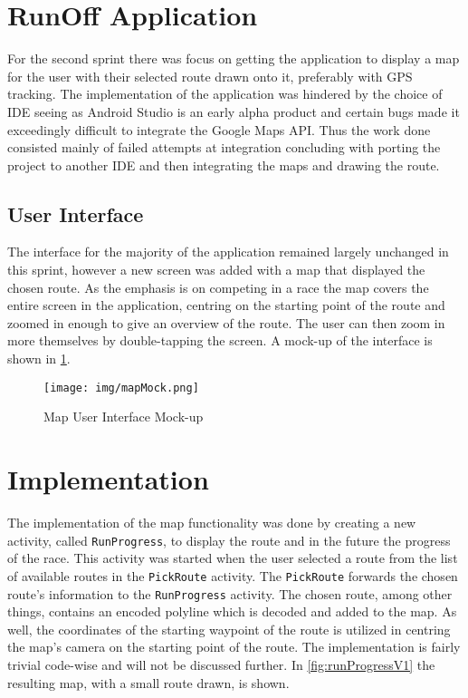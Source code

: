 \section{RunOff Application}
For the second sprint there was focus on getting the application to display a map for the user with their selected route drawn onto it, preferably with \ac{GPS} tracking. The implementation of the application was hindered by the choice of \ac{IDE} seeing as Android Studio is an early alpha product and certain bugs made it exceedingly difficult to integrate the Google Maps \ac{API}. Thus the work done consisted mainly of failed attempts at integration concluding with porting the project to another \ac{IDE} and then integrating the maps and drawing the route.

\subsection{User Interface}
The interface for the majority of the application remained largely unchanged in this sprint, however a new screen was added with a map that displayed the chosen route. As the emphasis is on competing in a race the map covers the entire screen in the application, centring on the starting point of the route and zoomed in enough to give an overview of the route. The user can then zoom in more themselves by double-tapping the screen. A mock-up of the interface is shown in \ref{fig:mapMock}.

\begin{figure}[ht]
\begin{center}
 \caption{Map User Interface Mock-up}
 \label{fig:mapMock}
 \texttt{[image: img/mapMock.png]}
\end{center}
\end{figure}

\section{Implementation}
The implementation of the map functionality was done by creating a new activity, called \texttt{RunProgress}, to display the route and in the future the progress of the race. This activity was started when the user selected a route from the list of available routes in the \texttt{PickRoute} activity. The \texttt{PickRoute} forwards the chosen route's information to the \texttt{RunProgress} activity. The chosen route, among other things, contains an encoded polyline which is decoded and added to the map. As well, the coordinates of the starting waypoint of the route is utilized in centring the map's camera on the starting point of the route. The implementation is fairly trivial code-wise and will not be discussed further. In \ref{fig:runProgressV1} the resulting map, with a small route drawn, is shown.

